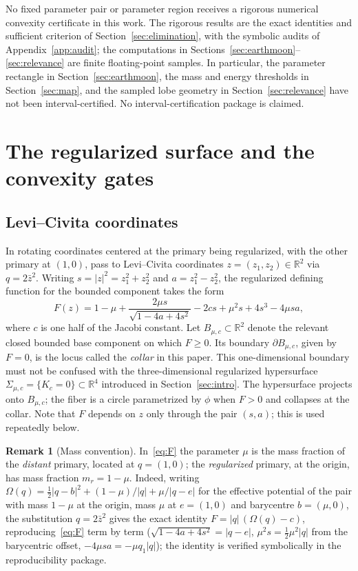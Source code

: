 \documentclass[11pt,reqno]{amsart}
\theoremstyle{plain}
\theoremstyle{definition}
\newtheorem{remark}[theorem]{Remark}
\newcommand{\R}{\mathbb{R}}
\begin{document}
No fixed parameter pair or parameter region receives a rigorous numerical convexity certificate in this work. The rigorous results are the exact identities and sufficient criterion of Section~\ref{sec:elimination}, with the symbolic audits of Appendix~\ref{app:audit}; the computations in Sections~\ref{sec:earthmoon}--\ref{sec:relevance} are finite floating-point samples. In particular, the parameter rectangle in Section~\ref{sec:earthmoon}, the mass and energy thresholds in Section~\ref{sec:map}, and the sampled lobe geometry in Section~\ref{sec:relevance} have not been interval-certified. No interval-certification package is claimed.

\section{The regularized surface and the convexity gates}\label{sec:setup}

\subsection{Levi--Civita coordinates}
In rotating coordinates centered at the primary being regularized, with the other primary at $(1,0)$, pass to Levi--Civita coordinates $z=(z_1,z_2)\in\R^2$ via $q=2\bar z^2$. Writing $s=|z|^2=z_1^2+z_2^2$ and $a=z_1^2-z_2^2$, the regularized defining function for the bounded component takes the form
\begin{equation}\label{eq:F}
F(z)=1-\mu+\frac{2\mu s}{\sqrt{1-4a+4s^2}}-2cs+\mu^2 s+4s^3-4\mu s a,
\end{equation}
where $c$ is one half of the Jacobi constant. Let $B_{\mu,c}\subset\R^2$ denote the relevant closed bounded base component on which $F\ge0$. Its boundary $\partial B_{\mu,c}$, given by $F=0$, is the locus called the \emph{collar} in this paper. This one-dimensional boundary must not be confused with the three-dimensional regularized hypersurface $\Sigma_{\mu,c}=\{K_c=0\}\subset\R^4$ introduced in Section~\ref{sec:intro}. The hypersurface projects onto $B_{\mu,c}$; the fiber is a circle parametrized by $\phi$ when $F>0$ and collapses at the collar. Note that $F$ depends on $z$ only through the pair $(s,a)$; this is used repeatedly below.

\begin{remark}[Mass convention]\label{rem:mass}
In~\eqref{eq:F} the parameter $\mu$ is the mass fraction of the \emph{distant} primary, located at $q=(1,0)$; the \emph{regularized} primary, at the origin, has mass fraction $m_r=1-\mu$. Indeed, writing $\Omega(q)=\tfrac12|q-b|^2+(1-\mu)/|q|+\mu/|q-e|$ for the effective potential of the pair with mass $1-\mu$ at the origin, mass $\mu$ at $e=(1,0)$ and barycentre $b=(\mu,0)$, the substitution $q=2\bar z^2$ gives the exact identity $F=|q|\,(\Omega(q)-c)$, reproducing~\eqref{eq:F} term by term ($\sqrt{1-4a+4s^2}=|q-e|$, $\mu^2 s=\tfrac12\mu^2|q|$ from the barycentric offset, $-4\mu sa=-\mu q_1|q|$); the identity is verified symbolically in the reproducibility package.
\end{remark}
\end{document}
